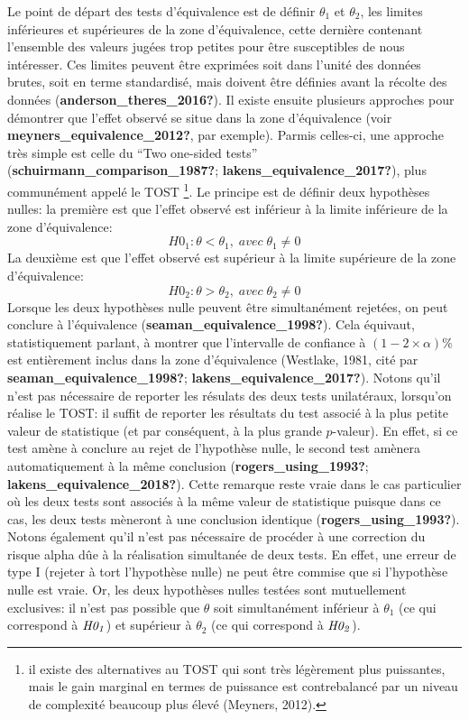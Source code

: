 \documentclass[
  english,
  man]{apa6}
\begin{document}
Le point de départ des tests d'équivalence est de définir \(\theta_1\) et \(\theta_2\), les limites inférieures et supérieures de la zone d'équivalence, cette dernière contenant l'ensemble des valeurs jugées trop petites pour être susceptibles de nous intéresser. Ces limites peuvent être exprimées soit dans l'unité des données brutes, soit en terme standardisé, mais doivent être définies avant la récolte des données (\textbf{anderson\_theres\_2016?}). Il existe ensuite plusieurs approches pour démontrer que l'effet observé se situe dans la zone d'équivalence (voir \textbf{meyners\_equivalence\_2012?}, par exemple). Parmis celles-ci, une approche très simple est celle du ``Two one-sided tests'' (\textbf{schuirmann\_comparison\_1987?}; \textbf{lakens\_equivalence\_2017?}), plus communément appelé le TOST \footnote{il existe des alternatives au TOST qui sont très légèrement plus puissantes, mais le gain marginal en termes de puissance est contrebalancé par un niveau de complexité beaucoup plus élevé (Meyners, 2012).}. Le principe est de définir deux hypothèses nulles: la première est que l'effet observé est inférieur à la limite inférieure de la zone d'équivalence: \[H0_1: \theta < \theta_1, \; avec \; \theta_1 \neq 0\] La deuxième est que l'effet observé est supérieur à la limite supérieure de la zone d'équivalence: \[H0_2: \theta > \theta_2, \; avec \; \theta_2 \neq 0\] Lorsque les deux hypothèses nulle peuvent être simultanément rejetées, on peut conclure à l'équivalence (\textbf{seaman\_equivalence\_1998?}). Cela équivaut, statistiquement parlant, à montrer que l'intervalle de confiance à \((1-2\times\alpha)\%\) est entièrement inclus dans la zone d'équivalence (Westlake, 1981, cité par \textbf{seaman\_equivalence\_1998?}; \textbf{lakens\_equivalence\_2017?}). Notons qu'il n'est pas nécessaire de reporter les résulats des deux tests unilatéraux, lorsqu'on réalise le TOST: il suffit de reporter les résultats du test associé à la plus petite valeur de statistique (et par conséquent, à la plus grande \(p\)-valeur). En effet, si ce test amène à conclure au rejet de l'hypothèse nulle, le second test amènera automatiquement à la même conclusion (\textbf{rogers\_using\_1993?}; \textbf{lakens\_equivalence\_2018?}). Cette remarque reste vraie dans le cas particulier où les deux tests sont associés à la même valeur de statistique puisque dans ce cas, les deux tests mèneront à une conclusion identique (\textbf{rogers\_using\_1993?}). Notons également qu'il n'est pas nécessaire de procéder à une correction du risque alpha dûe à la réalisation simultanée de deux tests. En effet, une erreur de type I (rejeter à tort l'hypothèse nulle) ne peut être commise que si l'hypothèse nulle est vraie. Or, les deux hypothèses nulles testées sont mutuellement exclusives: il n'est pas possible que \(\theta\) soit simultanément inférieur à \(\theta_1\) (ce qui correspond à \(\it H0_1\)) et supérieur à \(\theta_2\) (ce qui correspond à \(\it H0_2\)).
\end{document}
